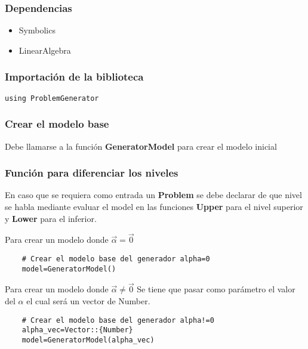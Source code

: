 \subsubsection{Dependencias}
\begin{itemize}
    \item Symbolics 
    \item LinearAlgebra
\end{itemize}

\subsubsection{Importación de la biblioteca}

\begin{lstlisting}[caption=Importar el Modulo]
    using ProblemGenerator
\end{lstlisting}

\subsubsection{Crear el modelo base}
Debe llamarse a la función \textbf{GeneratorModel} para crear el modelo 
inicial 

\subsubsection{Función para diferenciar los niveles}
En caso que se requiera como entrada un \textbf{Problem} se debe declarar
de que nivel se habla mediante evaluar el model en las funciones \textbf{Upper} para el nivel 
superior y \textbf{Lower} para el inferior.


Para crear un modelo donde $\vec{\alpha}=\vec{0}$
\begin{lstlisting}
    # Crear el modelo base del generador alpha=0
    model=GeneratorModel()
\end{lstlisting}

Para crear un modelo donde $\vec{\alpha}\neq \vec{0}$
Se tiene que pasar como parámetro el valor del $\alpha$
el cual será un vector de Number.
\begin{lstlisting}
    # Crear el modelo base del generador alpha!=0
    alpha_vec=Vector::{Number}
    model=GeneratorModel(alpha_vec)
\end{lstlisting}

